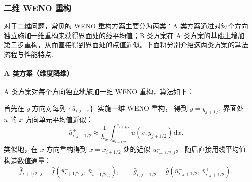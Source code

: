 \documentclass[12pt,a4paper]{article}
\numberwithin{equation}{section}    %
\begin{document}





\subsubsection{二维 WENO 重构}


对于二维问题，常见的 WENO 重构方案主要分为两类：A 类方案通过对每个方向独立施加一维重构来获得界面处的线平均值；B 类方案在 A 类方案的基础上增加第二步重构，从而直接得到界面处的点值近似。下面将分别介绍这两类方案的算法流程与性能特点.



\paragraph{A 类方案（维度降维）}

A 类方案对每个方向独立地施加一维 WENO 重构，算法如下：

首先在 $y$ 方向对每列 $\{\bar{u}_{i, j+r}\}_{r}$ 实施一维 WENO 重构，
得到 $y = y_{j+1/2}$ 界面处 $u$ 的 $x$ 方向单元平均值近似：
\begin{equation}
    \bar{u}^{\pm}_{i, j+1/2}
    \approx \frac{1}{h_x}\int_{x_{i-1/2}}^{x_{i+1/2}}
    u(x, y_{j+1/2})\,\mathrm{d}x.
\end{equation}
类似地，在 $x$ 方向重构得到 $x = x_{i+1/2}$ 处的近似
$\bar{u}^{\pm}_{i+1/2, j}$。
随后直接用线平均值构造数值通量：
\begin{equation}
    \hat{f}_{i+1/2,\, j}
    = \hat{f}\!\left(\bar{u}^-_{i+1/2,j},\,\bar{u}^+_{i+1/2,j}\right),
    \qquad
    \hat{g}_{i,\, j+1/2}
    = \hat{g}\!\left(\bar{u}^-_{i,j+1/2},\,\bar{u}^+_{i,j+1/2}\right).
\end{equation}
\end{document}
